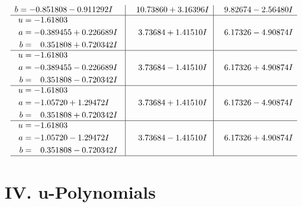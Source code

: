 \documentclass[1p]{elsarticle_modified}
\theoremstyle{definition}
\begin{document}
$$\begin{array}{c|c|c}
\begin{aligned}
b &= -0.851808 - 0.911292 I\end{aligned}
 & \phantom{-}10.73860 + 3.16396 I & \phantom{-}9.82674 - 2.56480 I \\ \hline\begin{aligned}
u &= -1.61803\phantom{ +0.000000I} \\
a &= -0.389455 + 0.226689 I \\
b &= \phantom{-}0.351808 + 0.720342 I\end{aligned}
 & \phantom{-}3.73684 + 1.41510 I & \phantom{-}6.17326 - 4.90874 I \\ \hline\begin{aligned}
u &= -1.61803\phantom{ +0.000000I} \\
a &= -0.389455 - 0.226689 I \\
b &= \phantom{-}0.351808 - 0.720342 I\end{aligned}
 & \phantom{-}3.73684 - 1.41510 I & \phantom{-}6.17326 + 4.90874 I \\ \hline\begin{aligned}
u &= -1.61803\phantom{ +0.000000I} \\
a &= -1.05720 + 1.29472 I \\
b &= \phantom{-}0.351808 + 0.720342 I\end{aligned}
 & \phantom{-}3.73684 + 1.41510 I & \phantom{-}6.17326 - 4.90874 I \\ \hline\begin{aligned}
u &= -1.61803\phantom{ +0.000000I} \\
a &= -1.05720 - 1.29472 I \\
b &= \phantom{-}0.351808 - 0.720342 I\end{aligned}
 & \phantom{-}3.73684 - 1.41510 I & \phantom{-}6.17326 + 4.90874 I\\
 \hline 
 \end{array}$$\newpage
\newpage\renewcommand{\arraystretch}{1}
\centering \section*{ IV. u-Polynomials}
\end{document}
